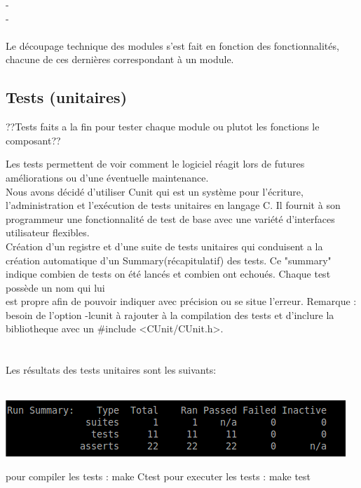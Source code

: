 \documentclass[a4]{article}
\begin{document}
    -\\
		
    -\\ \\
		

		Le découpage technique des modules s'est fait en fonction des fonctionnalités, chacune de ces dernières correspondant 
    à un module.
		
		\subsection{Tests (unitaires)}
??Tests faits a la fin pour tester chaque module ou plutot les fonctions le composant?? 		

Les tests permettent de voir comment le logiciel réagit lors de futures améliorations ou d'une éventuelle maintenance. \\ 
 
Nous avons décidé d'utiliser Cunit qui est un système pour l'écriture, l'administration et l'exécution de tests unitaires
en langage C. Il fournit à son programmeur une fonctionnalité de test de base avec une variété d'interfaces utilisateur flexibles.\\
Création d'un registre et d'une suite de tests unitaires qui conduisent a la création automatique d'un Summary(récapitulatif)
des tests. Ce "summary" indique combien de tests on été lancés et combien ont echoués. Chaque test possède un nom qui lui\\
est propre afin de pouvoir indiquer avec précision ou se situe l'erreur.
Remarque : besoin de l'option -lcunit à rajouter à la compilation des tests et d'inclure la bibliotheque avec un
\#include <CUnit/CUnit.h>.\\ \\ \\ 

  
Les résultats des tests unitaires sont les suivants:\\ \\ 
		 \begin{center}\includegraphics[scale=0.5]{Capture.png}\end{center}
	pour compiler les tests : make Ctest
	pour executer les tests : make test
\end{document}
